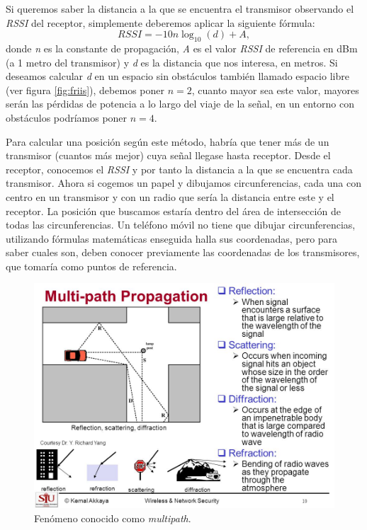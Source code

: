 Si queremos saber la distancia a la que se encuentra el transmisor observando el \textit{RSSI} del receptor, simplemente deberemos aplicar la siguiente fórmula:
\begin{equation}
RSSI = -10n\log_{10}(d) + A,
\end{equation}
donde \textit{n} es la constante de propagación, \textit{A} es el valor \textit{RSSI} de referencia en dBm (a 1 metro del transmisor) y \textit{d} es la distancia que nos interesa, en metros. Si deseamos calcular \textit{d} en un espacio sin obstáculos también llamado espacio libre (ver figura \ref{fig:friis}), debemos poner ${n = 2}$, cuanto mayor sea este valor, mayores serán las pérdidas de potencia a lo largo del viaje de la señal, en un entorno con obstáculos podríamos poner ${n = 4}$.

Para calcular una posición según este método, habría que tener más de un transmisor (cuantos más mejor) cuya señal llegase hasta receptor. Desde el receptor, conocemos el \textit{RSSI} y por tanto la distancia a la que se encuentra cada transmisor. Ahora si cogemos un papel y dibujamos circunferencias, cada una con centro en un transmisor y con un radio que sería la distancia entre este y el receptor. La posición que buscamos estaría dentro del área de intersección de todas las circunferencias. Un teléfono móvil no tiene que dibujar circunferencias, utilizando fórmulas matemáticas enseguida halla sus coordenadas, pero para saber cuales son, deben conocer previamente las coordenadas de los transmisores, que tomaría como puntos de referencia.

\begin{figure}[tbp]
\centering
\includegraphics[scale=0.38]{figures/multipath.jpg}
\caption{Fenómeno conocido como \textit{multipath}.\label{fig:multipath}}
\end{figure}


